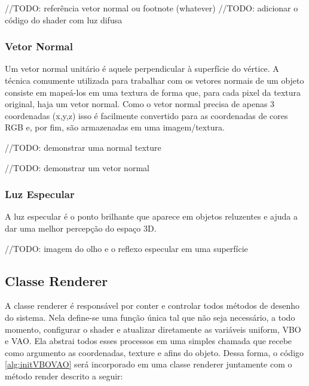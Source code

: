 \documentclass[12pt, 
openright, 
oneside, 
a4paper,    
brazil]{facom-ufu-abntex2}
\begin{document}
//TODO: referência vetor normal ou footnote (whatever)
//TODO: adicionar o código do shader com luz difusa

\subsubsection{Vetor Normal}

Um vetor normal unitário é aquele perpendicular à superfície do vértice. A técnica comumente utilizada para trabalhar com os vetores normais de um objeto consiste em mapeá-los em uma textura de forma que, para cada pixel da textura original, haja um vetor normal. Como o vetor normal precisa de apenas 3 coordenadas (x,y,z) isso é facilmente convertido para as coordenadas de cores RGB e, por fim, são armazenadas em uma imagem/textura.

//TODO: demonstrar uma normal texture

//TODO: demonstrar um vetor normal


\subsubsection{Luz Especular}
A luz especular é o ponto brilhante que aparece em objetos reluzentes e ajuda a dar uma melhor percepção do espaço 3D.

//TODO: imagem do olho e o reflexo especular em uma superfície


\subsection{Classe Renderer}

A classe renderer é responsável por conter e controlar todos métodos de desenho do sistema. Nela define-se uma função única tal que não seja necessário, a todo momento, configurar o shader e atualizar diretamente as variáveis uniform, VBO e VAO. Ela abstrai todos esses processos em uma simples chamada que recebe como argumento as coordenadas, texture e afins do objeto. Dessa forma, o código \ref{alg:initVBOVAO} será incorporado em uma classe renderer juntamente com o método render descrito a seguir:
\end{document}
